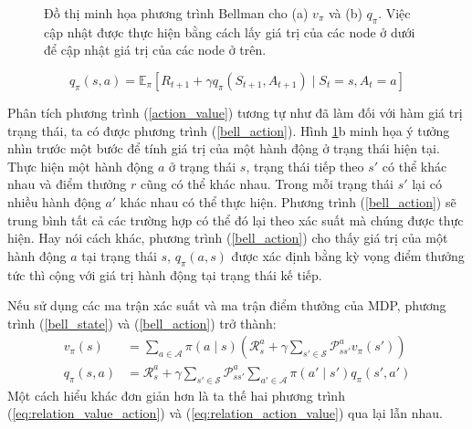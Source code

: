\begin{figure}
	\caption[Đồ thị minh họa phương trình Bellman cho hàm giá trị]{Đồ thị minh họa phương trình Bellman cho (a) $v_{\pi}$ và (b) $q_{\pi}$.
	Việc cập nhật được thực hiện bằng cách lấy giá trị của các node ở dưới để cập nhật giá trị của các node ở trên.
	}
	\label{backup_diagram}
\end{figure}

\begin{equation}
\label{bell_action}
q_{\pi}(s,a) = \mathbb{E}_{\pi} \left[\mathit{R}_{t+1} + \gamma q_{\pi}(\mathit{S}_{t+1}, \mathit{A}_{t+1}) \mid \mathit{S}_t = s, \mathit{A}_t = a \right]
\end{equation}

Phân tích phương trình (\ref{action_value}) tương tự như đã làm đối với hàm giá trị trạng thái, ta có được phương trình (\ref{bell_action}).
Hình \ref{backup_diagram}b minh họa ý tưởng nhìn trước một bước để tính giá trị của một hành động ở trạng thái hiện tại. 
Thực hiện một hành động $a$ ở trạng thái $s$, trạng thái tiếp theo $s'$ có thể khác nhau và điểm thưởng $r$ cũng có thể khác nhau. 
Trong mỗi trạng thái $s'$ lại có nhiều hành động $a'$ khác nhau có thể thực hiện. 
Phương trình (\ref{bell_action}) sẽ trung bình tất cả các trường hợp có thể đó lại theo xác suất mà chúng được thực hiện. 
Hay nói cách khác, phương trình (\ref{bell_action}) cho thấy giá trị của một hành động $a$ tại trạng thái $s$, $q_{\pi}(a,s)$ được xác định bằng kỳ vọng điểm thưởng tức thì cộng với giá trị hành động tại trạng thái kế tiếp.

Nếu sử dụng các ma trận xác suất và ma trận điểm thưởng của MDP, phương trình (\ref{bell_state}) và (\ref{bell_action}) trở thành:
\begin{align}
	v_{\pi}(s) &= \sum_{a \in \mathcal{A}}^{}\pi(a \mid s) \left( \mathcal{R}_{s}^{a} + \gamma \sum_{s' \in \mathcal{S}}^{}\mathcal{P}_{ss'}^{a}v_{\pi}(s') \right) \label{eq:bellman_mdp_state}\\
	q_{\pi}(s, a) &= \mathcal{R}_{s}^{a} + \gamma \sum_{s' \in \mathcal{S}}^{}\mathcal{P}_{ss'}^{a} \sum_{a' \in \mathcal{A}}^{}\pi(a' \mid s') q_{\pi}(s', a') \label{eq:bellman_mdp_action}
\end{align}
Một cách hiểu khác đơn giản hơn là ta thế hai phương trình (\ref{eq:relation_value_action}) và (\ref{eq:relation_action_value}) qua lại lẫn nhau.

